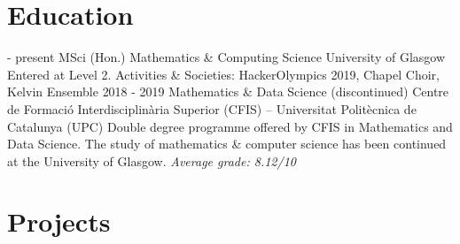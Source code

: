 \documentclass[]{twentysecondcv}
\begin{document}



\begin{adjustwidth}{10pt}{10pt}

\section*{Education}

\renewcommand{\twentylen}{11cm}
\begin{twenty}[1.5cm]
  \twentyitem
    { - present}
    {\large MSci (Hon.) Mathematics \& Computing Science}
    {University of Glasgow}
    {Entered at Level 2. Activities \& Societies: HackerOlympics 2019, Chapel Choir, Kelvin Ensemble}
  \twentyitem
    {2018 - 2019}
    {Mathematics \& Data Science (discontinued)}
    {Centre de Formació Interdisciplinària Superior (CFIS) – Universitat Politècnica de Catalunya (UPC)}
    {Double degree programme offered by CFIS in Mathematics and Data Science. The study of mathematics \& computer science has been continued at the University of Glasgow. \textit{Average grade: 8.12/10}}
\end{twenty}


\section*{Projects}


\end{adjustwidth}
\end{document}
